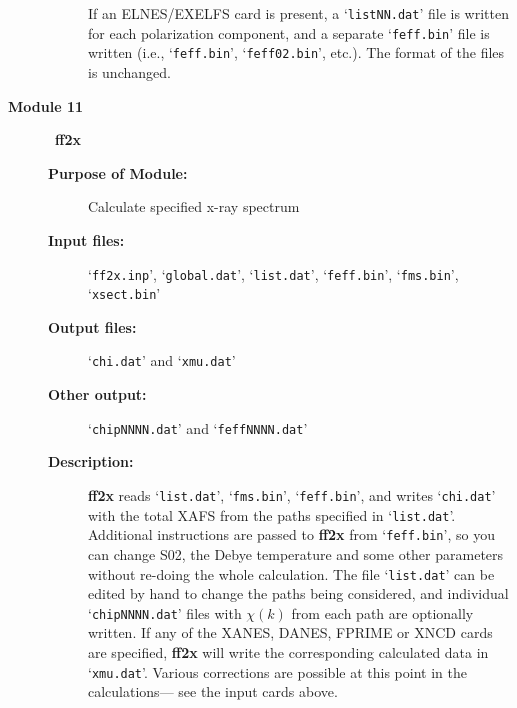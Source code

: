 \documentclass[11pt,oneside]{report} %
\renewcommand{\htmlref}[2]{\hyperlink{#2}{#1}}
\newcommand{\file}[1]{`\texttt{#1}'}
\newcommand{\module}[1]{\textrm{\bf{#1}}}
\renewcommand{\htmlref}[2]{{#1}} %
\begin{document}
\begin{latexonly}
\begin{description}
\begin{description}
    If an ELNES/EXELFS card is present, a \file{listNN.dat} file is 
    written for each polarization component, and a separate \file{feff.bin} 
    file is written (i.e., \file{feff.bin}, \file{feff02.bin}, etc.). 
    The format of the files is unchanged.
  \end{description}
\item [\large\textbf{Module 11}]\dotfill\  {\large\module{ff2x}}
  \begin{description}
  \item[\textbf{Purpose of Module:}] Calculate specified x-ray spectrum
  \item[\textbf{Input files:}] \file{ff2x.inp}, \file{global.dat},
    \file{list.dat}, \file{feff.bin}, \file{fms.bin}, \file{xsect.bin}
  \item[\textbf{Output files:}] \file{chi.dat} and \file{xmu.dat}
  \item[\textbf{Other output:}] \file{chipNNNN.dat} and \file{feffNNNN.dat}
  \item[\textbf{Description:}] \module{ff2x} reads \file{list.dat},
    \file{fms.bin}, \file{feff.bin}, and writes \file{chi.dat}
    with the total XAFS from the paths specified in \file{list.dat}.
    Additional instructions are passed to \module{ff2x} from \file{feff.bin}, so you
    can change S02, the Debye temperature and some other parameters
    without re-doing the whole calculation. The file \file{list.dat}
    can be edited by hand to change the paths being considered, and
    individual \file{chipNNNN.dat} files with $\chi(k)$ from each path are
    optionally written. If any of the \htmlref{XANES}{card:xan}, 
    \htmlref{DANES}{card:dan}, \htmlref{FPRIME}{card:fpr} or 
    \htmlref{XNCD}{card:xnc} cards are specified, \module{ff2x} will write 
    the corresponding calculated data in \file{xmu.dat}. Various 
    corrections are possible at this point in the calculations---
    see the input cards above.


\end{description}
\end{description}
\end{latexonly}
\end{document}
